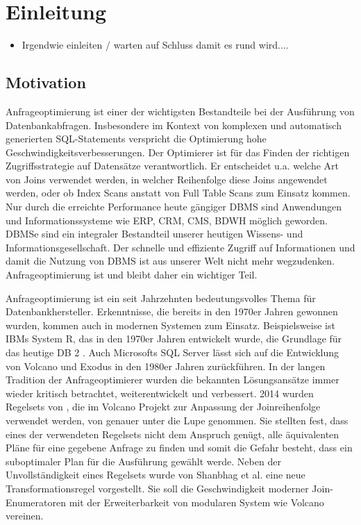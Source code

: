 \chapter{Einleitung}

\begin{itemize}
\item Irgendwie einleiten / warten auf Schluss damit es rund wird....
\end{itemize}



\section{Motivation}


Anfrageoptimierung ist einer der wichtigsten Bestandteile bei der Ausführung von Datenbankabfragen. Insbesondere im Kontext von komplexen und automatisch generierten SQL-Statements verspricht die Optimierung hohe Geschwindigkeitsverbesserungen. Der Optimierer ist für das Finden der richtigen Zugriffsstrategie auf Datensätze verantwortlich. Er entscheidet u.a. welche Art von Joins verwendet werden, in welcher Reihenfolge diese Joins angewendet werden, oder ob Index Scans anstatt von Full Table Scans zum Einsatz kommen. Nur durch die erreichte Performance heute gängiger \ac{DBMS} sind Anwendungen und Informationssysteme wie \ac{ERP}, \ac{CRM}, \ac{CMS}, \ac{BDWH} möglich geworden. \ac{DBMS}e sind ein integraler Bestandteil unserer heutigen Wissens- und Informationsgesellschaft. Der schnelle und effiziente Zugriff auf Informationen und damit die Nutzung von \ac{DBMS} ist aus unserer Welt nicht mehr wegzudenken. Anfrageoptimierung ist und bleibt daher ein wichtiger Teil.

Anfrageoptimierung ist ein seit Jahrzehnten bedeutungsvolles Thema für Datenbankhersteller. Erkenntnisse, die bereits in den 1970er Jahren gewonnen wurden, kommen auch in modernen Systemen zum Einsatz. Beispielsweise ist IBMs System R, das in den 1970er Jahren entwickelt wurde, die Grundlage für das heutige DB 2  \cite{wade2012ibm}. Auch Microsofts SQL Server lässt sich auf die Entwicklung von Volcano und Exodus in den 1980er Jahren zurückführen.
In der langen Tradition der Anfrageoptimierer wurden die bekannten Lösungsansätze immer wieder kritisch betrachtet, weiterentwickelt und verbessert. 2014 wurden Regelsets von \cite{pellenkoft1997complexity}, die im Volcano Projekt zur Anpassung der Joinreihenfolge verwendet werden, von \cite{shanbhag2014optimizing} genauer unter die Lupe genommen. 
Sie stellten fest, dass eines der verwendeten Regelsets nicht dem Anspruch genügt, alle äquivalenten Pläne für eine gegebene Anfrage zu finden und somit die Gefahr besteht, dass ein suboptimaler Plan für die Ausführung gewählt werde. Neben der Unvollständigkeit eines Regelsets wurde von Shanbhag et al. eine neue Transformationsregel vorgestellt. Sie soll die Geschwindigkeit moderner Join-Enumeratoren mit der Erweiterbarkeit von modularen System wie Volcano vereinen.


